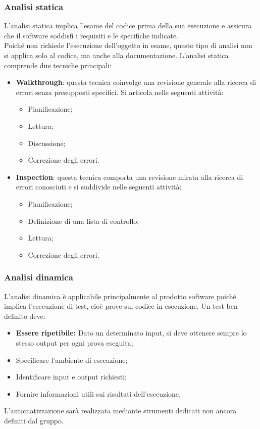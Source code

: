 \subsubsection{Analisi statica}
L'analisi statica implica l'esame del codice prima della sua esecuzione e assicura che il software soddisfi i requisiti 
e le specifiche indicate. \\
Poiché non richiede l'esecuzione dell'oggetto in esame, questo tipo di analisi non si applica solo al codice, ma anche alla documentazione.
L'analisi statica comprende due tecniche principali:
\begin{itemize}
    \item \textbf{Walkthrough}: questa tecnica coinvolge una revisione generale alla ricerca di errori
    senza presupposti specifici. Si articola nelle seguenti attività:
    \begin{itemize}
        \item Pianificazione;
        \item Lettura;
        \item Discussione;
        \item Correzione degli errori.
    \end{itemize}
    \item \textbf{Inspection}: questa tecnica comporta una revisione mirata alla ricerca di errori conosciuti
    e si suddivide nelle seguenti attività:
    \begin{itemize}
        \item Pianificazione;
        \item Definizione di una lista di controllo;
        \item Lettura;
        \item Correzione degli errori.
    \end{itemize}
\end{itemize}
\subsubsection{Analisi dinamica}
L'analisi dinamica è applicabile principalmente al prodotto software
poiché implica l'esecuzione di test, cioè prove sul codice in esecuzione.
Un test ben definito deve:
\begin{itemize}
    \item \textbf{Essere ripetibile:} Dato un determinato input, si deve ottenere sempre
    lo stesso output per ogni prova eseguita;
    \item Specificare l'ambiente di esecuzione;
    \item Identificare input e output richiesti;
    \item Fornire informazioni utili sui risultati dell'esecuzione.
\end{itemize}
L'automatizzazione sarà realizzata mediante strumenti dedicati non ancora definiti dal gruppo.
